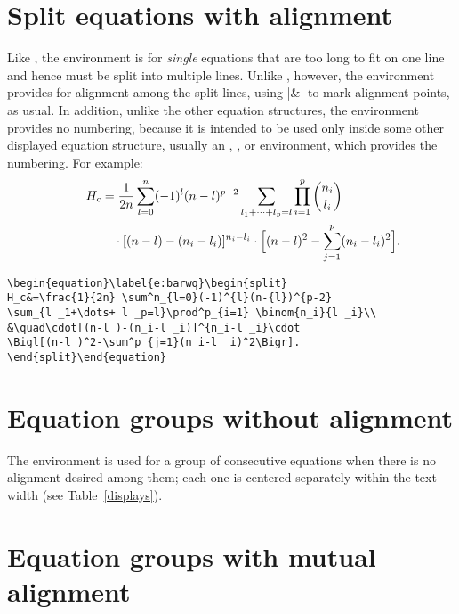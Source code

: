 \documentclass[leqno,titlepage,openany]{amsldoc}
\begin{document}
\section{Split equations with alignment}

Like , the  environment is for \emph{single}
equations that are too long to fit on one line and hence must be split
into multiple lines.  Unlike , however, the 
environment provides for alignment among the split lines, using |&| to
mark alignment points, as usual. In addition, unlike the other
 equation structures, the  environment provides
no numbering, because it is intended to be used only inside some other
displayed equation structure, usually an , ,
or  environment, which provides the numbering.
For example:
\begin{equation}\label{e:barwq}\begin{split}
H_c&=\frac{1}{2n} \sum^n_{l=0}(-1)^{l}(n-{l})^{p-2}
\sum_{l _1+\dots+ l _p=l}\prod^p_{i=1} \binom{n_i}{l _i}\\
&\quad\cdot[(n-l )-(n_i-l _i)]^{n_i-l _i}\cdot
\Bigl[(n-l )^2-\sum^p_{j=1}(n_i-l _i)^2\Bigr].
\kern-2em %
\end{split}\end{equation}

\begin{verbatim}
\begin{equation}\label{e:barwq}\begin{split}
H_c&=\frac{1}{2n} \sum^n_{l=0}(-1)^{l}(n-{l})^{p-2}
\sum_{l _1+\dots+ l _p=l}\prod^p_{i=1} \binom{n_i}{l _i}\\
&\quad\cdot[(n-l )-(n_i-l _i)]^{n_i-l _i}\cdot
\Bigl[(n-l )^2-\sum^p_{j=1}(n_i-l _i)^2\Bigr].
\end{split}\end{equation}
\end{verbatim}

\section{Equation groups without alignment}

The  environment is  used for a group of consecutive
equations when there is no alignment desired among them; each one
is centered separately within the text width (see Table~\ref{displays}).

\section{Equation groups with mutual alignment}
\end{document}
